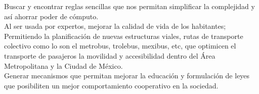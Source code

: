 \documentclass[10pt]{article}
\begin{document}
Buscar y encontrar reglas sencillas que nos permitan simplificar la complejidad y así ahorrar poder de cómputo. \\

Al ser usada por expertos, mejorar la calidad de vida de los habitantes; Permitiendo la planificación de nuevas estructuras viales, rutas de transporte colectivo como lo son el metrobus, trolebus, mexibus, etc, que optimicen el transporte de pasajeros la movilidad y accesibilidad dentro del Área Metropolitana y la Ciudad de México.\\

Generar mecanismos que permitan mejorar la educación y formulación de leyes que posibiliten un mejor comportamiento cooperativo en la sociedad.   
\end{document}
